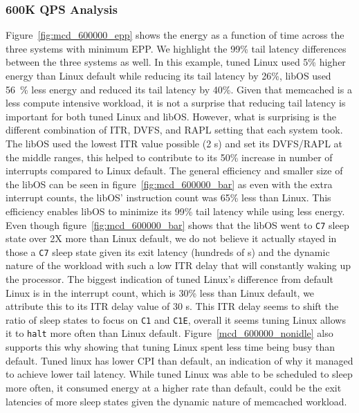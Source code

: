 \subsubsection{600K QPS Analysis}
Figure~\ref{fig:mcd_600000_epp} shows the energy as a function of time across the three systems with minimum EPP. We highlight the 99\% tail latency differences between the three systems as well. In this example, tuned Linux used 5\% higher energy than Linux default while reducing its tail latency by 26\%, libOS used 56 \% less energy and reduced its tail latency by 40\%. Given that memcached is a less compute intensive workload, it is not a surprise that reducing tail latency is important for both tuned Linux and libOS. However, what is surprising is the different combination of ITR, DVFS, and RAPL setting that each system took. The libOS used the lowest ITR value possible (2 \micro s) and set its DVFS/RAPL at the middle ranges, this helped to contribute to its 50\% increase in number of interrupts compared to Linux default. The general efficiency and smaller size of the libOS can be seen in figure~\ref{fig:mcd_600000_bar} as even with the extra interrupt counts, the libOS' instruction count was 65\% less than Linux. This efficiency enables libOS to minimize its 99\% tail latency while using less energy. Even though figure~\ref{fig:mcd_600000_bar} shows that the libOS went to \texttt{C7} sleep state over 2X more than Linux default, we do not believe it actually stayed in those a \texttt{C7} sleep state given its exit latency (hundreds of \micro s) and the dynamic nature of the workload with such a low ITR delay that will constantly waking up the processor. The biggest indication of tuned Linux's difference from default Linux is in the interrupt count, which is 30\% less than Linux default, we attribute this to its ITR delay value of 30 \micro s. This ITR delay seems to shift the ratio of sleep states to focus on \texttt{C1} and \texttt{C1E}, overall it seems tuning Linux allows it to \texttt{halt} more often than Linux default. Figure~\ref{mcd_600000_nonidle} also supports this why showing that tuning Linux spent less time being busy than default. Tuned linux has lower CPI than default, an indication of why it managed to achieve lower tail latency. While tuned Linux was able to be scheduled to sleep more often, it consumed energy at a higher rate than default, could be the exit latencies of more sleep states given the dynamic nature of memcached workload.


